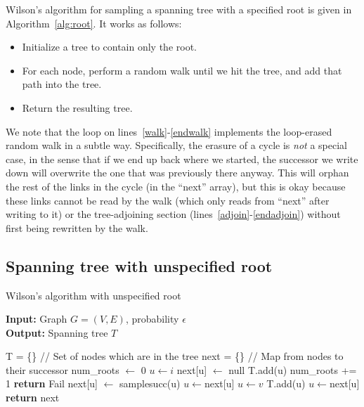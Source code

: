 \documentclass[11pt]{article}
\begin{document}
Wilson's algorithm for sampling a spanning tree with a specified root is given
in Algorithm~\ref{alg:root}. It works as follows:
\begin{itemize}
\item Initialize a tree to contain only the root.
\item For each node, perform a random walk until we hit the tree, and add that
path into the tree.
\item Return the resulting tree.
\end{itemize}


We note that the loop on lines~\ref{walk}-\ref{endwalk} implements the
loop-erased random walk in a subtle way.  Specifically, the erasure of a cycle is
\emph{not} a special case, in the sense that if we end up back where we started,
the successor we write down will overwrite the one that was previously there
anyway. This will orphan the rest of the links in the cycle (in the ``next''
array), but this is okay because these links cannot be read by the walk (which only
reads from ``next'' after writing to it) or the tree-adjoining section
(lines~\ref{adjoin}-\ref{endadjoin}) without first being rewritten by the
walk.

\subsection{Spanning tree with unspecified root}
\begin{algorithm}
\caption{Wilson's algorithm with unspecified root}
\label{alg:noroot}
\textbf{Input: }Graph $G=(V,E)$, probability $\epsilon$ \\
\textbf{Output: }Spanning tree $T$ \\
\begin{algorithmic}
\STATE T = \{\}                   // Set of nodes which are in the tree
\STATE next = \{\}                // Map from nodes to their successor
\STATE num\_roots $\leftarrow$ 0
\STATE $u \leftarrow i$
\STATE next[u] $\leftarrow$ null
\STATE T.add(u)
\STATE num\_roots += 1
\STATE \textbf{return} Fail
\ENDIF
\ELSE
\STATE next[u] $\leftarrow$ samplesucc(u)
\STATE $u \leftarrow $next[u]
\ENDIF
\STATE $u \leftarrow v$
\ENDWHILE
{} \label{adjoin}
\STATE T.add(u)
\STATE $u \leftarrow $next[u]
\ENDWHILE
\ENDFOR
\STATE \textbf{return} next
\end{algorithmic}
\end{algorithm}
\end{document}
